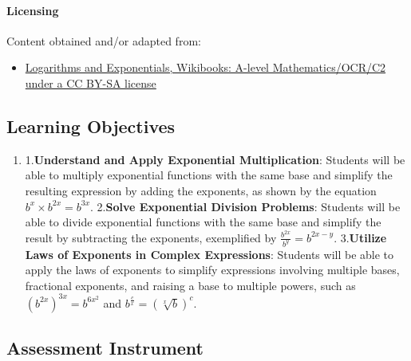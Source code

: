 \paragraph{Licensing}

Content obtained and/or adapted from:

\begin{itemize}
    \item \href{https://en.wikibooks.org/wiki/A-level_Mathematics/OCR/C2/Logarithms_and_Exponentials}{Logarithms and Exponentials, Wikibooks: A-level Mathematics/OCR/C2 under a CC BY-SA license}
\end{itemize}

\subsection{Learning Objectives}

\begin{enumerate}
    \item 1.\textbf{Understand and Apply Exponential Multiplication}: Students will be able to multiply exponential functions with the same base and simplify the resulting expression by adding the exponents, as shown by the equation $b^x \times b^{2x} = b^{3x}$. 2.\textbf{Solve Exponential Division Problems}: Students will be able to divide exponential functions with the same base and simplify the result by subtracting the exponents, exemplified by $\frac{b^{2x}}{b^y} = b^{2x - y}$. 3.\textbf{Utilize Laws of Exponents in Complex Expressions}: Students will be able to apply the laws of exponents to simplify expressions involving multiple bases, fractional exponents, and raising a base to multiple powers, such as $\left(b^{2x}\right)^{3x} = b^{6x^2}$ and $b^{\frac{c}{x}} = \left(\sqrt[x]{b}\right)^c$.
\end{enumerate}

\subsection{Assessment Instrument}

